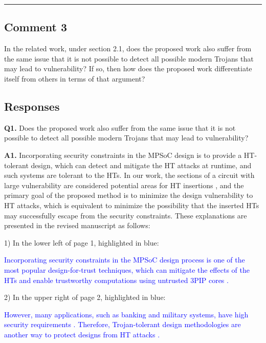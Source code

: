 \documentclass[10pt,journal, compsoc]{IEEEtran}
\begin{document}
\noindent\rule[0.25\baselineskip]{252pt}{1pt}

\subsection*{Comment 3}
In the related work, under section 2.1, does the proposed work also suffer from the same issue that it is not possible to detect all possible modern Trojans that may lead to vulnerability?  If so, then how does the proposed work differentiate itself from others in terms of that argument?

\subsection*{Responses}

\textbf{Q1.} Does the proposed work also suffer from the same issue that it is not possible to detect all possible modern Trojans that may lead to vulnerability?

\vspace*{1em}

\textbf{A1.} Incorporating security constraints in the MPSoC design is to provide a HT-tolerant design, which can detect and mitigate the HT attacks at runtime, and such systems are tolerant to the HTs. In our work, the sections of a circuit with large vulnerability are considered potential areas for HT insertions  \cite{article:JC,article:YD}, and the primary goal of the proposed method is to minimize the design vulnerability to HT attacks, which is equivalent to minimize the possibility that the inserted HTs may successfully escape from the security constraints. These explanations are presented in the revised manuscript as follows:

\vspace{0.5em}

1) In the lower left of page 1, highlighted in blue:

\textcolor{blue}{Incorporating security constraints in the MPSoC design process is one of the most popular design-for-trust techniques, which can mitigate the effects of the HTs and enable trustworthy computations using untrusted 3PIP cores \cite{article:JR3, article:TR, conference:MB, conference:XC, conference:MS}.}

\vspace{0.5em}

2) In the upper right of page 2, highlighted in blue:

\textcolor{blue}{However, many applications, such as banking and military systems, have high security requirements \cite{conference:XZ}. Therefore, Trojan-tolerant design methodologies are another way to protect designs from HT attacks \cite{article:KX}.}
\end{document}
